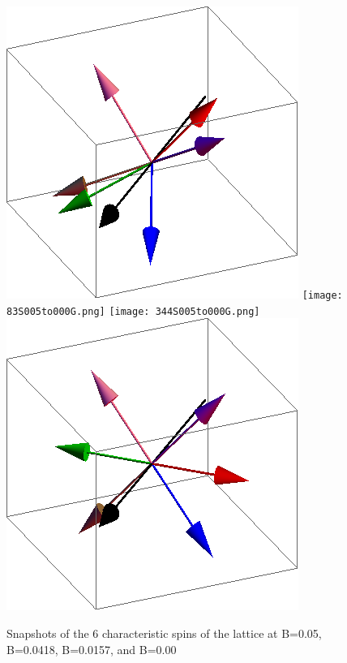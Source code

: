 \documentclass{article}
\begin{document}
\begin{figure}[ht]
\centering
\includegraphics[scale=0.27]{1S005to000G.png}
\texttt{[image: 83S005to000G.png]}
\texttt{[image: 344S005to000G.png]}
\includegraphics[scale=0.27]{501S005to000G.png}
\caption{Snapshots of the 6 characteristic spins of the lattice at B=0.05, B=0.0418, B=0.0157, and B=0.00}
\end{figure}
\end{document}
